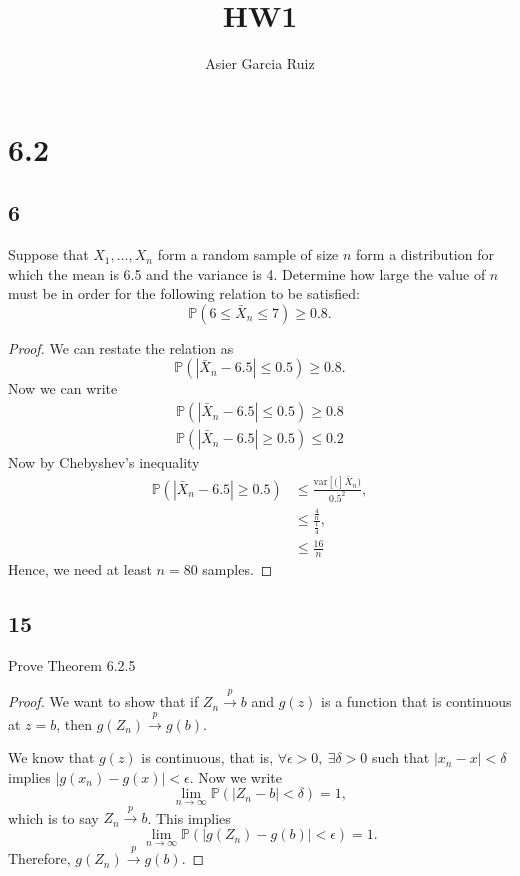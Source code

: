\documentclass{article}
\title{HW1}
\author{Asier Garcia Ruiz}
\renewcommand{\P}[1]{\mathbb{P}\left(#1\right)}
\newcommand{\var}[1]{\text{var}\left[#1\right]}
\newcommand{\randsamp}{X_1,\dots,X_n}
\begin{document}
\maketitle

\section*{6.2}
\subsection*{6}
Suppose that $\randsamp$ form a random sample of size $n$ form a distribution for which the
mean is 6.5 and the variance is 4. Determine how large the value of $n$ must be in order
for the following relation to be satisfied:
\begin{equation*}
    \P{6 \leq \bar{X}_n \leq 7} \geq 0.8.
\end{equation*}

\begin{proof}
    We can restate the relation as
    \begin{equation*}
        \P{|\bar{X}_n - 6.5| \leq 0.5} \geq 0.8.
    \end{equation*}
    Now we can write
    \begin{gather*}
        \P{|\bar{X}_n - 6.5| \leq 0.5} \geq 0.8 \\
        \P{|\bar{X}_n - 6.5| \geq 0.5} \leq 0.2
    \end{gather*}
    Now by Chebyshev's inequality
    \begin{align*}
        \P{|\bar{X}_n - 6.5| \geq 0.5} & \leq \frac{\var(\bar{X}_n)}{0.5^2},   \\
                                       & \leq \frac{\frac{4}{n}}{\frac{1}{4}}, \\
                                       & \leq \frac{16}{n}
    \end{align*}
    Hence, we need at least $n = 80$ samples.
\end{proof}

\subsection*{15}
Prove Theorem 6.2.5

\begin{proof}
    We want to show that if $Z_n \stackrel{p}{\to} b$ and $g(z)$ is a function that is
    continuous at $z = b$, then $g(Z_n) \stackrel{p}{\to} g(b)$.

    We know that $g(z)$ is continuous, that is, $\forall \epsilon > 0, \ \exists \delta >0$
    such that $|x_n - x| < \delta$ implies $|g(x_n) - g(x)| < \epsilon$. Now we write
    \begin{equation*}
        \lim_{n\to\infty} \P{|Z_n - b| < \delta} = 1,
    \end{equation*}
    which is to say $Z_n \stackrel{p}{\to} b$. This implies
    \begin{equation*}
        \lim_{n\to\infty} \P{|g(Z_n) - g(b)| < \epsilon} = 1.
    \end{equation*}
    Therefore, $g(Z_n) \stackrel{p}{\to} g(b)$.
\end{proof}
\end{document}
